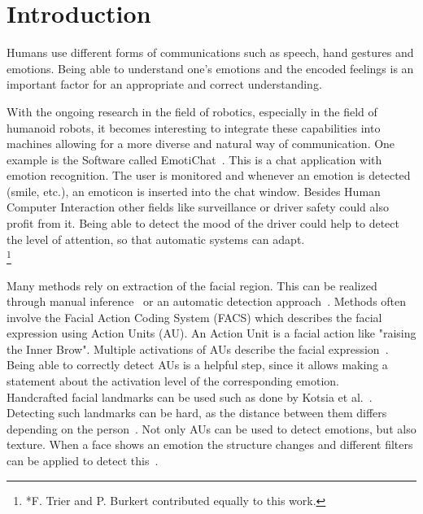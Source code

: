\section{Introduction}

Humans use different forms of communications such as speech, hand gestures and emotions. Being able to understand one's emotions and the encoded feelings is an important factor for an appropriate and correct understanding.


With the ongoing research in the field of robotics, especially in the field of humanoid robots, it becomes interesting to integrate these capabilities into machines allowing for a more diverse and natural way of communication. One example is the Software called EmotiChat~\cite{Anderson06areal-time}. This is a chat application with emotion recognition. The user is monitored and whenever an emotion is detected (smile, etc.), an emoticon is inserted into the chat window. Besides Human Computer Interaction other fields like surveillance or driver safety could also profit from it. Being able to detect the mood of the driver could help to detect the level of attention, so that automatic systems can adapt.\\
\let\thefootnote\relax\footnote{*F. Trier and P. Burkert contributed equally to this work.}


Many methods rely on extraction of the facial region. This can be realized through manual inference~\cite{4032815} or an automatic detection approach~\cite{Anderson06areal-time}.
Methods often involve the Facial Action Coding System (FACS) which describes the facial expression using Action Units (AU). An Action Unit is a facial action like "raising the Inner Brow". Multiple activations of AUs describe the facial expression~\cite{kumar2009face}. Being able to correctly detect AUs is a helpful step, since it allows making a statement about the activation level of the corresponding emotion. \\
Handcrafted facial landmarks can be used such as done by Kotsia et al.~\cite{4032815}. Detecting such landmarks can be hard, as the distance between them differs depending on the person~\cite{6998925}. Not only AUs can be used to detect emotions, but also texture. When a face shows an emotion the structure changes and different filters can be applied to detect this~\cite{6998925}.\\



